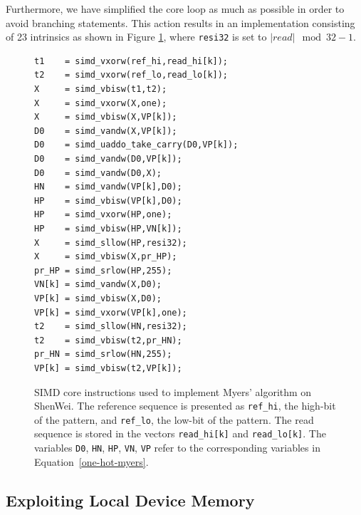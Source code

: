 \documentclass[conference]{IEEEtran}
\begin{document}
Furthermore, we have simplified the core loop as much as possible in
order to avoid branching statements. This action results in an
implementation consisting of 23 intrinsics as shown in Figure
\ref{cores}, where \texttt{resi32} is set to $|read|\mod 32 - 1$.

\begin{figure}[!htb]
    \begin{lstlisting}[frame=single, xleftmargin=3.5ex]
t1    = simd_vxorw(ref_hi,read_hi[k]);
t2    = simd_vxorw(ref_lo,read_lo[k]);
X     = simd_vbisw(t1,t2); 
X     = simd_vxorw(X,one); 
X     = simd_vbisw(X,VP[k]);
D0    = simd_vandw(X,VP[k]);
D0    = simd_uaddo_take_carry(D0,VP[k]);
D0    = simd_vandw(D0,VP[k]);
D0    = simd_vandw(D0,X);
HN    = simd_vandw(VP[k],D0);
HP    = simd_vbisw(VP[k],D0);
HP    = simd_vxorw(HP,one);
HP    = simd_vbisw(HP,VN[k]);	
X     = simd_sllow(HP,resi32);
X     = simd_vbisw(X,pr_HP);
pr_HP = simd_srlow(HP,255);
VN[k] = simd_vandw(X,D0);
VP[k] = simd_vbisw(X,D0);
VP[k] = simd_vxorw(VP[k],one);
t2    = simd_sllow(HN,resi32);
t2    = simd_vbisw(t2,pr_HN);
pr_HN = simd_srlow(HN,255);
VP[k] = simd_vbisw(t2,VP[k]);	
    \end{lstlisting}
    \caption{SIMD core instructions used to implement Myers' algorithm
      on ShenWei. The reference sequence is presented as
      \texttt{ref\_hi}, the high-bit of the pattern, and
      \texttt{ref\_lo}, the low-bit of the pattern. The read sequence
      is stored in the vectors \texttt{read\_hi[k]} and
      \texttt{read\_lo[k]}. The variables \texttt{D0}, \texttt{HN},
      \texttt{HP}, \texttt{VN}, \texttt{VP} refer to the corresponding
      variables in Equation~\ref{one-hot-myers}.}
    \label{cores}
\end{figure}

\subsection{Exploiting Local Device Memory}
\end{document}

